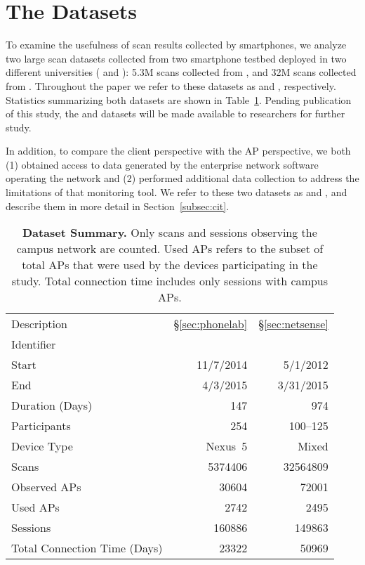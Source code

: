 
\section{The Datasets}
\label{sec:dataset}

To examine the usefulness of \wifi{} scan results collected by smartphones, we
analyze two large scan datasets collected from two smartphone testbed deployed
in two different universities (\ub{} and \nd{}): 5.3M scans collected from \PhoneLab{}, and 32M
scans collected from \NetSense{}. Throughout the paper we refer to these
datasets as \textbf{\ubscan{}} and \textbf{\ndscan{}}, respectively.  Statistics
summarizing both datasets are shown in Table~\ref{tab:stats}. Pending
publication of this study, the \ubscan{} and \ndscan{} datasets will be made
available to researchers for further study.

In addition, to compare the client perspective with the AP perspective, we
both (1) obtained access to data generated by the enterprise network software
operating the \ub{} \wifi{} network and (2) performed additional data collection
to address the limitations of that monitoring tool. We refer to these two
datasets as \textbf{\ubap{}} and \textbf{\ubapdetail{}}, and describe them in
more detail in Section~\ref{subsec:cit}.

\begin{table}[t]
  {\small
  \begin{tabularx}{\columnwidth}{Xrr}
    & \PhoneLab{} & \NetSense{}\\\midrule
    Description & \S\ref{sec:phonelab} & \S\ref{sec:netsense} \\
    Identifier & \ubscan{} & \ndscan{} \\ 
    Start & 11/7/2014 & 5/1/2012 \\ 
    End & 4/3/2015 & 3/31/2015 \\ 
    Duration (Days) & 147 & 974 \\ \midrule
    Participants & 254 & 100--125 \\
    Device Type & Nexus~5 & Mixed \\ \midrule
    Scans & \num{5374406} & \num{32564809} \\
    Observed APs & \num{30604} & \num{72001} \\
    Used APs & \num{2742} & \num{2495}\\ \midrule
    \wifi{} Sessions & \num{160886} & \num{149863} \\
    Total Connection Time (Days) & \num{23322} & \num{50969} 
  \end{tabularx}
  \caption{\textbf{Dataset Summary.} Only \wifi{} scans and sessions
  observing the campus network are counted. Used APs refers to the subset of
  total APs that were used by the devices participating in the study. Total
connection time includes only \wifi{} sessions with campus APs.}
  \label{tab:stats}
}
\end{table}


